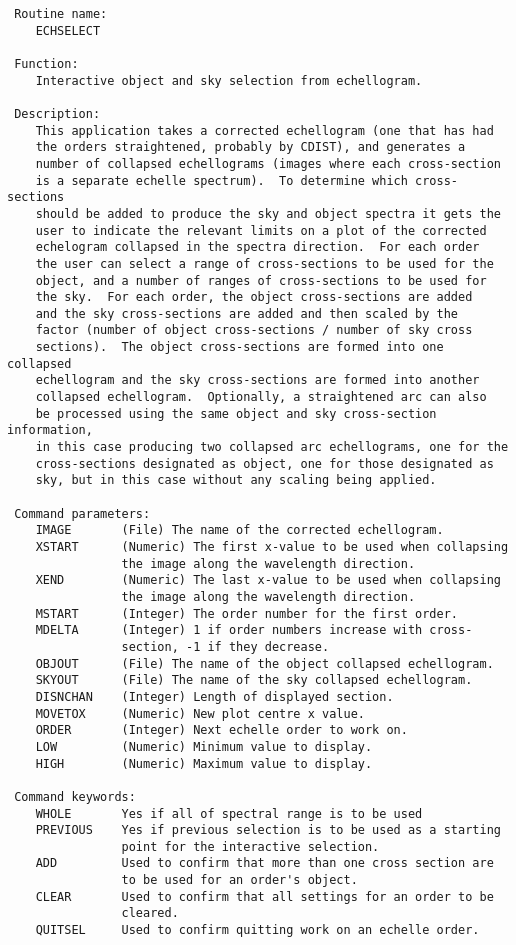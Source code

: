 \begin{description}
\begin{verbatim}
 Routine name:
    ECHSELECT

 Function:
    Interactive object and sky selection from echellogram.

 Description:
    This application takes a corrected echellogram (one that has had
    the orders straightened, probably by CDIST), and generates a
    number of collapsed echellograms (images where each cross-section
    is a separate echelle spectrum).  To determine which cross-sections
    should be added to produce the sky and object spectra it gets the
    user to indicate the relevant limits on a plot of the corrected
    echelogram collapsed in the spectra direction.  For each order
    the user can select a range of cross-sections to be used for the
    object, and a number of ranges of cross-sections to be used for
    the sky.  For each order, the object cross-sections are added
    and the sky cross-sections are added and then scaled by the
    factor (number of object cross-sections / number of sky cross
    sections).  The object cross-sections are formed into one collapsed
    echellogram and the sky cross-sections are formed into another
    collapsed echellogram.  Optionally, a straightened arc can also
    be processed using the same object and sky cross-section information,
    in this case producing two collapsed arc echellograms, one for the
    cross-sections designated as object, one for those designated as
    sky, but in this case without any scaling being applied.

 Command parameters:
    IMAGE       (File) The name of the corrected echellogram.
    XSTART      (Numeric) The first x-value to be used when collapsing
                the image along the wavelength direction.
    XEND        (Numeric) The last x-value to be used when collapsing
                the image along the wavelength direction.
    MSTART      (Integer) The order number for the first order.
    MDELTA      (Integer) 1 if order numbers increase with cross-
                section, -1 if they decrease.
    OBJOUT      (File) The name of the object collapsed echellogram.
    SKYOUT      (File) The name of the sky collapsed echellogram.
    DISNCHAN    (Integer) Length of displayed section.
    MOVETOX     (Numeric) New plot centre x value.
    ORDER       (Integer) Next echelle order to work on.
    LOW         (Numeric) Minimum value to display.
    HIGH        (Numeric) Maximum value to display.

 Command keywords:
    WHOLE       Yes if all of spectral range is to be used
    PREVIOUS    Yes if previous selection is to be used as a starting
                point for the interactive selection.
    ADD         Used to confirm that more than one cross section are
                to be used for an order's object.
    CLEAR       Used to confirm that all settings for an order to be
                cleared.
    QUITSEL     Used to confirm quitting work on an echelle order.


\end{verbatim}
\end{description}
